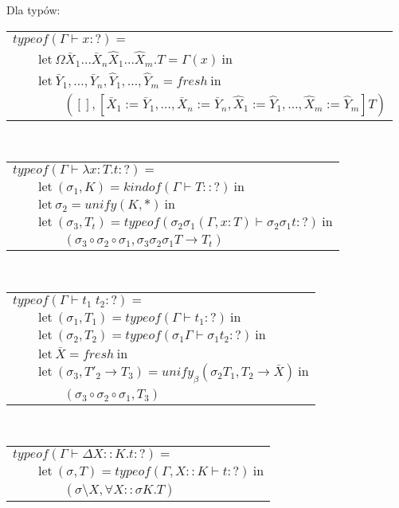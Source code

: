 \documentclass[11pt,leqno]{article}
\begin{document}
Dla typów:\\
\begin{tabular}{l}
$typeof(\Gamma \vdash x : ?) = $ \\
$\qquad \textrm{let} \ \Omega \bar{X}_1 \dots \bar{X}_n \widehat{X}_1 \dots \widehat{X}_m.T = \Gamma(x) \ \textrm{in} $ \\
$\qquad \textrm{let} \ \bar{Y}_1, \dots, \bar{Y}_n, \widehat{Y}_1, \dots, \widehat{Y}_m = fresh \ \textrm{in} $ \\
$\qquad\qquad ([], [\bar{X}_1 := \bar{Y}_1, \dots ,\bar{X}_n := \bar{Y}_n,\widehat{X}_1 := \widehat{Y}_1, \dots ,\widehat{X}_m := \widehat{Y}_m]T) $ \\
\end{tabular} \\
\begin{tabular}{l}
$typeof(\Gamma \vdash \lambda x:T.t : ?) = $ \\
$\qquad \textrm{let} \ (\sigma_1, K) = kindof(\Gamma \vdash T :: ?) \ \textrm{in} $ \\
$\qquad \textrm{let} \ \sigma_2 = unify(K, *) \ \textrm{in} $ \\
$\qquad \textrm{let} \ (\sigma_3, T_t) = typeof(\sigma_2 \sigma_1(\Gamma, x:T) \vdash \sigma_2 \sigma_1 t : ?) \ \textrm{in} $ \\
$\qquad\qquad (\sigma_3 \circ \sigma_2 \circ \sigma_1, \sigma_3 \sigma_2 \sigma_1 T \rightarrow T_t) $ \\
\end{tabular} \\
\begin{tabular}{l}
$typeof(\Gamma \vdash t_1 \; t_2 : ?) = $ \\
$\qquad \textrm{let} \ (\sigma_1, T_1) = typeof(\Gamma \vdash t_1 : ?) \ \textrm{in} $ \\
$\qquad \textrm{let} \ (\sigma_2, T_2) = typeof(\sigma_1 \Gamma \vdash \sigma_1 t_2 : ?) \ \textrm{in} $ \\
$\qquad \textrm{let} \ \bar{X} = fresh \ \textrm{in} $ \\
$\qquad \textrm{let} \ (\sigma_3, T'_2 \to T_3) = unify_\beta(\sigma_2 T_1, T_2 \rightarrow \bar{X}) \ \textrm{in} $ \\
$\qquad\qquad (\sigma_3 \circ \sigma_2 \circ \sigma_1, T_3) $ \\
\end{tabular} \\
\begin{tabular}{l}
$typeof(\Gamma \vdash \Delta X::K.t : ?) = $ \\
$\qquad \textrm{let} \ (\sigma, T) = typeof(\Gamma, X::K \vdash t : ?) \ \textrm{in} $ \\
$\qquad\qquad (\sigma \setminus X, \forall X::\sigma K.T) $ \\
\end{tabular} \\
\end{document}
